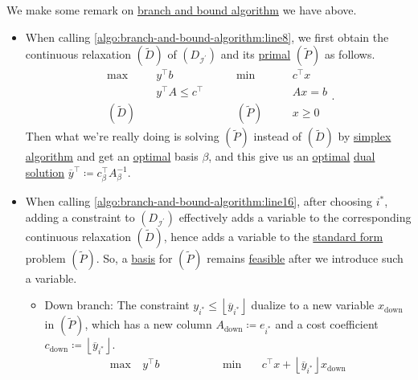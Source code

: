 \begin{remark}
	We make some remark on \hyperref[algo:branch-and-bound-algorithm]{branch and bound algorithm} we have above.
	\begin{itemize}
		\item When calling \autoref{algo:branch-and-bound-algorithm:line8}, we first obtain the continuous relaxation \((\widetilde{D})\) of
		      \((D_{\mathcal{I} ^\prime })\) and its \hyperref[def:primal]{primal} \((\widetilde{P} )\) as follows.
		      \[
			      \begin{alignedat}{5}
				      \max ~&y^{\top}b\qquad\qquad	&&\min~		&&c^{\top}x\\
				      &y^{\top}A\leq c^{\top} 		&&			&&Ax = b\\
				      (\widetilde{D})\quad	& 				&&(\widetilde{P})\quad	&&x\geq  0
			      \end{alignedat}.
		      \]
		      Then what we're really doing is solving \((\widetilde{P})\) instead of \((\widetilde{D} )\) by \hyperref[algo:simplex-algorithm]{simplex algorithm}
		      and get an \hyperref[def:optimal-solution]{optimal} basis \(\beta\), and this give us an \hyperref[def:optimal-solution]{optimal}
		      \hyperref[def:dual-basic-solution]{dual solution} \(\overline{y}^{\top}\coloneqq c^{\top}_{\beta}A^{-1} _{\beta}\).
		\item When calling \autoref{algo:branch-and-bound-algorithm:line16}, after choosing \(i^{\ast} \), adding a constraint to \((D_{\mathcal{I} ^\prime })\)
		      effectively adds a variable to the corresponding continuous relaxation \((\widetilde{D})\), hence adds a variable to the \hyperref[def:standard-form]{standard form}
		      problem \((\widetilde{P} )\). So, a \hyperref[def:basic]{basis} for \((\widetilde{P})\) remains \hyperref[def:feasible-solution]{feasible} after we introduce
		      such a variable.
		      \begin{itemize}
			      \item\label{rmk:down-branch} Down branch: The constraint \(y_{i^{\ast}} \leq \left\lfloor \overline{y}_{i^{\ast}} \right\rfloor\) dualize to a new variable
			      \(x_{\text{down}}\) in \((\widetilde{P})\), which has a new column \(A_{\text{down}}\coloneqq e_{i^{\ast}}\) and a cost coefficient
			      \(c_{\text{down}}\coloneqq \left\lfloor \overline{y} _{i^{\ast}}\right\rfloor \).
			      \[
				      \begin{alignedat}{5}
					      \max ~	&y^{\top}b\qquad\qquad				&&\min~	&&c^{\top}x+\left\lfloor \overline{y}_{i^{\ast}} \right\rfloor x_{\text{down}}\\

\end{alignedat}\]
\end{itemize}
\end{itemize}
\end{remark}
